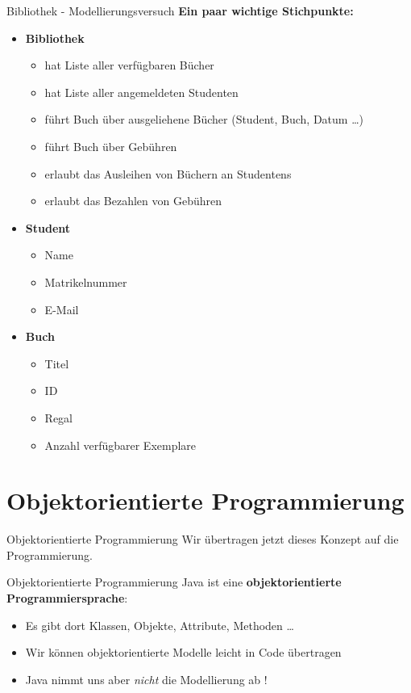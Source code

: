 \documentclass[18pt]{beamer}
\begin{document}
\begin{frame}{Bibliothek - Modellierungsversuch}
    \textbf{Ein paar wichtige Stichpunkte:}
    \begin{itemize}
        \item \textbf{Bibliothek}
        \begin{itemize}
            \item hat Liste aller verfügbaren Bücher
            \item hat Liste aller angemeldeten Studenten
            \item führt Buch über ausgeliehene Bücher (Student, Buch, Datum \dots)
            \item führt Buch über Gebühren
            \item erlaubt das Ausleihen von Büchern an Studentens
            \item erlaubt das Bezahlen von Gebühren
        \end{itemize}
        \pause
        \item \textbf{Student}
        \begin{itemize}
            \item Name
            \item Matrikelnummer
            \item E-Mail
        \end{itemize}
        \pause
        \item \textbf{Buch}
        \begin{itemize}
            \item Titel
            \item ID
            \item Regal
            \item Anzahl verfügbarer Exemplare
        \end{itemize}
    \end{itemize}

\end{frame}


\section{Objektorientierte Programmierung}

\begin{frame}{Objektorientierte Programmierung}
    Wir übertragen jetzt dieses Konzept auf die Programmierung.
\end{frame}

\begin{frame}{Objektorientierte Programmierung}
    Java ist eine \textbf{objektorientierte Programmiersprache}:
    \begin{itemize}
        \item Es gibt dort Klassen, Objekte, Attribute, Methoden \dots
        \item Wir können objektorientierte Modelle leicht in Code übertragen
        \item Java nimmt uns aber \textit{nicht} die Modellierung ab !
    \end{itemize}
\end{frame}
\end{document}
